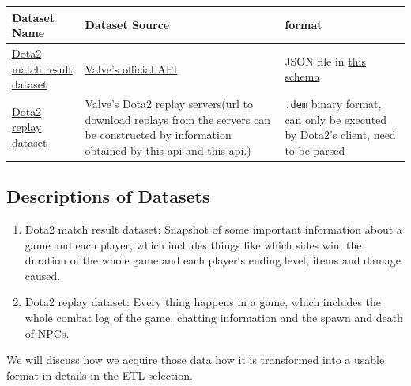 \documentclass{article}
\newcommand{\codeinline}[1]{
    \texttt{#1}
}
\begin{document}
\begin{center}
    \begin{tabular}{|p{4.5cm}|p{6cm}|p{2.5cm}|}
    \hline
    Dataset Name & Dataset Source & format \\
    \hline\hline
    \href{https://wiki.teamfortress.com/wiki/WebAPI/GetMatchDetails}{Dota2 match result dataset} & \href{https://wiki.teamfortress.com/wiki/WebAPI}{Valve's official API} & JSON file in \href{https://wiki.teamfortress.com/wiki/WebAPI/GetMatchDetails}{this schema}\\
    \hline
    \href{https://wiki.teamfortress.com/wiki/Replay}{Dota2 replay dataset} & Valve's Dota2 replay servers(url to download replays from the servers can  be constructed by information obtained by \href{https://docs.opendota.com/}{this api} and \href{https://wiki.teamfortress.com/wiki/WebAPI/GetMatchDetails}{this api}.) & \codeinline{.dem} binary format, can only be executed by Dota2's client, need to be parsed\\
    \hline
    \end{tabular}
\end{center}

\subsection{Descriptions of Datasets}
\begin{enumerate}
\item Dota2 match result dataset: Snapshot of some important information about a game and each player, which includes things like which sides win, the duration of the whole game and each player‘s ending level, items and damage caused.
\item Dota2 replay dataset: Every thing happens in a game, which includes the whole combat log of the game, chatting information and the spawn and death of NPCs.
\end{enumerate}

We will discuss how we acquire those data how it is transformed into a usable format in details in the ETL selection.
\end{document}
